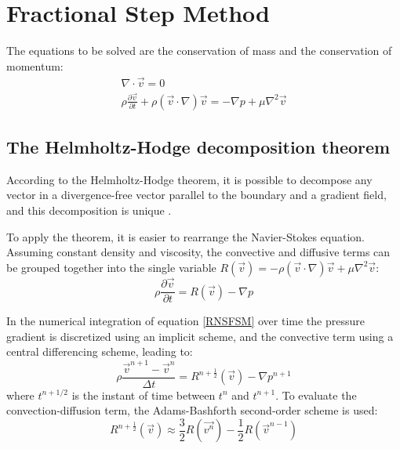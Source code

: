 \chapter{Fractional Step Method}
\label{FractionalStepM}
The equations to be solved are the conservation of mass and the conservation of momentum:
\begin{equation}
\begin{aligned}
\nabla\cdot\vec{v}=0 \\
\rho\frac{\partial\vec{v}}{\partial t}+\rho\left(\vec{v}\cdot\nabla\right)\vec{v}=-\nabla p+\mu\nabla^{2}\vec{v}
\end{aligned}
\label{MassandMomentum}
\end{equation}

\section{The Helmholtz-Hodge decomposition theorem}
According to the Helmholtz-Hodge theorem, it is possible to decompose any vector in a divergence-free vector parallel to the boundary and a gradient field, and this decomposition is unique \cite{CTTC}.

To apply the theorem, it is easier to rearrange the Navier-Stokes equation. Assuming constant density and viscosity, the convective and diffusive terms can be grouped together into the single variable $R\left(\vec{v}\right)=-\rho\left(\vec{v}\cdot\nabla\right)\vec{v}+\mu\nabla^{2}\vec{v}$:
\begin{equation}
\rho\frac{\partial\vec{v}}{\partial t}=R\left(\vec{v}\right)-\nabla p
\label{RNSFSM}
\end{equation}

In the numerical integration of equation \ref{RNSFSM} over time the pressure gradient is discretized using an implicit scheme, and the convective term using a central differencing scheme, leading to:
\begin{equation}
\rho\frac{\vec{v}^{n+1}-\vec{v}^{n}}{\Delta t}=R^{n+\frac{1}{2}}\left(\vec{v}\right)-\nabla p^{n+1}
\end{equation}
where $t^{n+1/2}$ is the instant of time between $t^{n}$ and $t^{n+1}$. To evaluate the convection-diffusion term, the Adams-Bashforth second-order scheme is used:
\begin{equation}
R^{n+\frac{1}{2}}\left(\vec{v}\right)\approx\frac{3}{2}R\left(\vec{v^{n}}\right)-\frac{1}{2}R\left(\vec{v}^{n-1}\right)
\label{AdamsBashforth}
\end{equation}

